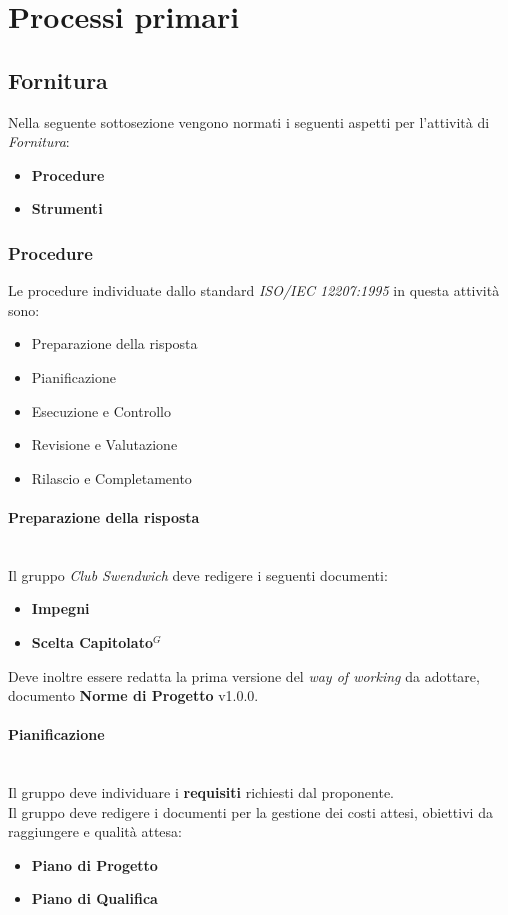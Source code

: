 \section{Processi primari}

\subsection{Fornitura}
Nella seguente sottosezione vengono normati i seguenti aspetti per l'attività di \textit{Fornitura}:
\begin{itemize}
    \item \textbf{Procedure}
    \item \textbf{Strumenti}
\end{itemize}

\subsubsection{Procedure}

Le procedure individuate dallo standard \textit{ISO/IEC 12207:1995} in questa attività sono:
\begin{itemize}
    \item Preparazione della risposta
    \item Pianificazione
    \item Esecuzione e Controllo
    \item Revisione e Valutazione
    \item Rilascio e Completamento
\end{itemize}

\paragraph{Preparazione della risposta}
\mbox{} \\
Il gruppo \textit{Club Swendwich} deve redigere i seguenti documenti:
\begin{itemize}
    \item \textbf{Impegni}
    \item \textbf{Scelta Capitolato$^G$}
\end{itemize}
Deve inoltre essere redatta la prima versione del \textit{way of working} da adottare, documento \textbf{Norme di Progetto} v1.0.0.

\paragraph{Pianificazione}
\mbox{} \\
Il gruppo deve individuare i \textbf{requisiti} richiesti dal proponente.\\
Il gruppo deve redigere i documenti per la gestione dei costi attesi, obiettivi da raggiungere e qualità attesa:
\begin{itemize}
    \item \textbf{Piano di Progetto}
    \item \textbf{Piano di Qualifica}
\end{itemize}

